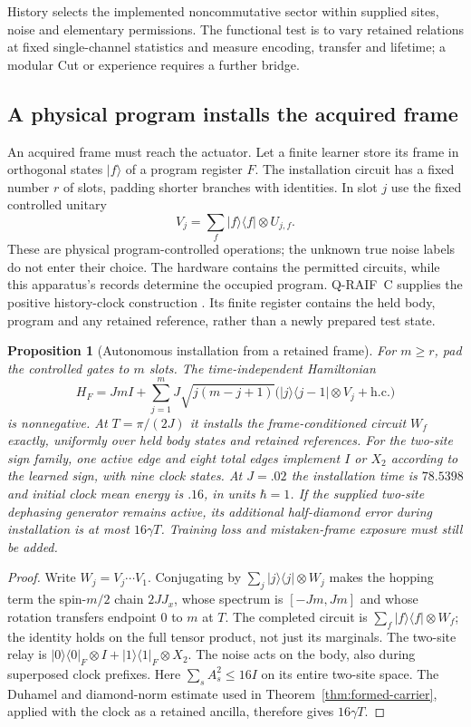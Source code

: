 \documentclass[11pt]{article}
\newtheorem{proposition}[theorem]{Proposition}
\theoremstyle{definition}
\theoremstyle{remark}
\begin{document}
History selects the implemented noncommutative sector within supplied sites, noise and elementary permissions. The functional test is to vary retained relations at fixed single-channel statistics and measure encoding, transfer and lifetime; a modular Cut or experience requires a further bridge.

\subsection{A physical program installs the acquired frame}
\label{sec:installed-program}

An acquired frame must reach the actuator. Let a finite learner store its
frame in orthogonal states $|f\rangle$ of a program register $F$.
The installation circuit has a fixed number $r$ of slots, padding shorter
branches with identities. In slot $j$ use the fixed controlled unitary
\[
 V_j=\sum_f |f\rangle\langle f|\otimes U_{j,f}.
\]
These are physical program-controlled operations; the unknown true noise
labels do not enter their choice. The hardware contains the permitted
circuits, while this apparatus's records determine the occupied program.
Q-RAIF~C supplies the positive history-clock construction
\cite{QRAIFC}. Its finite register contains the held body, program and
any retained reference, rather than a newly prepared test state.

\begin{proposition}[Autonomous installation from a retained frame]
\label{prop:installed-program}
For $m\ge r$, pad the controlled gates to $m$ slots. The time-independent
Hamiltonian
\[
 H_F=JmI+\sum_{j=1}^m J\sqrt{j(m-j+1)}
 \bigl(|j\rangle\langle j-1|\otimes V_j+\mathrm{h.c.}\bigr)
\]
is nonnegative. At $T=\pi/(2J)$ it installs the frame-conditioned circuit
$W_f$ exactly, uniformly over held body states and retained references.
For the two-site sign family, one active edge and eight total edges
implement $I$ or $X_2$ according to the learned sign, with nine clock
states. At $J=.02$ the installation time is $78.5398$ and initial clock
mean energy is $.16$, in units $\hbar=1$.
If the supplied two-site dephasing generator remains active, its
additional half-diamond error during installation is at most $16\gamma T$.
Training loss and mistaken-frame exposure must still be added.
\end{proposition}
\begin{proof}
Write $W_j=V_j\cdots V_1$. Conjugating by
$\sum_j|j\rangle\langle j|\otimes W_j$ makes the hopping term the
spin-$m/2$ chain $2JJ_x$, whose spectrum is $[-Jm,Jm]$ and whose
rotation transfers endpoint $0$ to $m$ at $T$.
The completed circuit is $\sum_f|f\rangle\langle f|\otimes W_f$;
the identity holds on the full tensor product, not just its marginals.
The two-site relay is $|0\rangle\langle0|_F\otimes I+
|1\rangle\langle1|_F\otimes X_2$.
The noise acts on the body, also during superposed clock prefixes.
Here $\sum_sA_s^2\le16I$ on its entire two-site space.
The Duhamel and diamond-norm estimate used in
Theorem~\ref{thm:formed-carrier}, applied with the clock as a retained
ancilla, therefore gives $16\gamma T$.
\end{proof}
\end{document}

